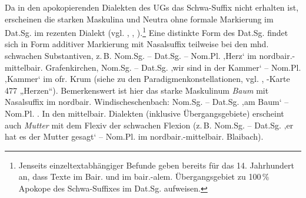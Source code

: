 \begin{sloppypar}
Da in den apokopierenden Dialekten des UGs das Schwa-Suffix nicht erhalten ist, erscheinen die starken Maskulina und Neutra ohne formale Markierung im Dat.Sg. im rezenten Dialekt (vgl. \citealt[45]{Mausser1915}, \citealt[437]{Schirmunski1962}, \citealt[§221]{Schmeller1821}).\footnote{Jenseits einzeltextabhängiger Befunde geben \citet[91]{KleinEtAl2018} bereits für das 14. Jahrhundert an, dass Texte im Bair. und im bair.-alem. Übergangsgebiet zu 100\,\% Apokope des Schwa-Suffixes im Dat.Sg. aufweisen.} Eine distinkte Form des Dat.Sg. findet sich in Form additiver Markierung mit Nasalsuffix teilweise bei den mhd. schwachen Substantiven, z.\,B. Nom.Sg.  -- Dat.Sg.   -- Nom.Pl.  ‚Herz‘ im nordbair.-mittelbair. Grafenkirchen, Nom.Sg.  -- Dat.Sg.     \linebreak{} ‚wir sind in der Kammer‘ -- Nom.Pl.  ‚Kammer‘ im ofr. Krum (siehe  zu den Paradigmenkonstellationen, vgl. \citealt[440]{Schirmunski1962}, \citealt{WA}-Karte 477 „Herzen“). Bemerkenswert ist hier das starke Maskulinum \textit{Baum} mit Nasalsuffix im nordbair. Windischeschenbach: Nom.Sg.  -- Dat.Sg.   ‚am Baum‘ -- Nom.Pl. . In den mittelbair. Dialekten (inklusive Übergangsgebiete) erscheint auch \textit{Mutter} mit dem Flexiv der schwachen Flexion (z.\,B. Nom.Sg.  -- Dat.Sg.      ‚er hat es der Mutter gesagt‘ -- Nom.Pl.  im nordbair.-mittelbair. Blaibach).
\end{sloppypar}

